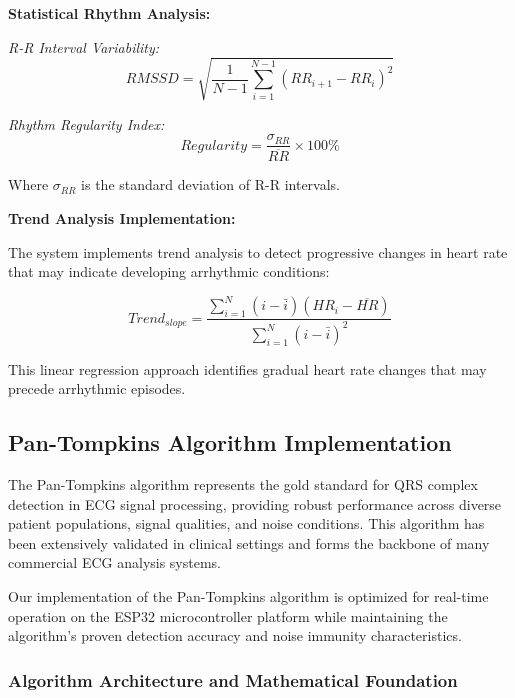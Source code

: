 \documentclass[12pt,a4paper]{article}
\begin{document}
\textbf{Statistical Rhythm Analysis:}

\textit{R-R Interval Variability:}
\begin{equation*}
RMSSD = \sqrt{\frac{1}{N-1}\sum_{i=1}^{N-1}(RR_{i+1} - RR_i)^2}
\end{equation*}

\textit{Rhythm Regularity Index:}
\begin{equation*}
Regularity = \frac{\sigma_{RR}}{\overline{RR}} \times 100\%
\end{equation*}

Where $\sigma_{RR}$ is the standard deviation of R-R intervals.

\vspace{0.3cm}

\textbf{Trend Analysis Implementation:}

The system implements trend analysis to detect progressive changes in heart rate that may indicate developing arrhythmic conditions:

\begin{equation*}
Trend_{slope} = \frac{\sum_{i=1}^{N}(i - \bar{i})(HR_i - \overline{HR})}{\sum_{i=1}^{N}(i - \bar{i})^2}
\end{equation*}

This linear regression approach identifies gradual heart rate changes that may precede arrhythmic episodes.

\subsection{Pan-Tompkins Algorithm Implementation}

The Pan-Tompkins algorithm represents the gold standard for QRS complex detection in ECG signal processing, providing robust performance across diverse patient populations, signal qualities, and noise conditions. This algorithm has been extensively validated in clinical settings and forms the backbone of many commercial ECG analysis systems.

\vspace{0.5cm}

Our implementation of the Pan-Tompkins algorithm is optimized for real-time operation on the ESP32 microcontroller platform while maintaining the algorithm's proven detection accuracy and noise immunity characteristics.

\subsubsection{Algorithm Architecture and Mathematical Foundation}
\end{document}
